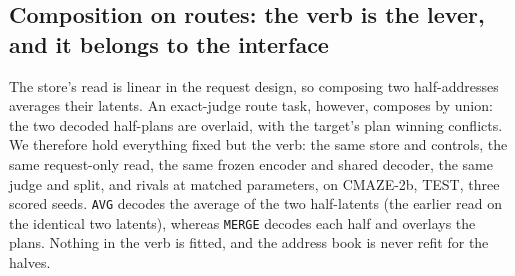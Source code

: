 \documentclass{article} %
\begin{document}
\subsection{Composition on routes: the verb is the lever, and it belongs to the interface}
\label{sec:verb}

The store's read is linear in the request design, so composing two half-addresses averages
their latents. An exact-judge route task, however, composes by union: the two decoded half-plans
are overlaid, with the target's plan winning conflicts. We therefore hold everything fixed but
the verb: the same store and controls, the same request-only read, the same frozen encoder and
shared decoder, the same judge and split, and rivals at matched parameters, on CMAZE-2b, TEST,
three scored seeds. \texttt{AVG} decodes the average of the two half-latents (the earlier read
on the identical two latents), whereas \texttt{MERGE} decodes each half and overlays the plans.
Nothing in the verb is fitted, and the address book is never refit for the halves. %
\end{document}
